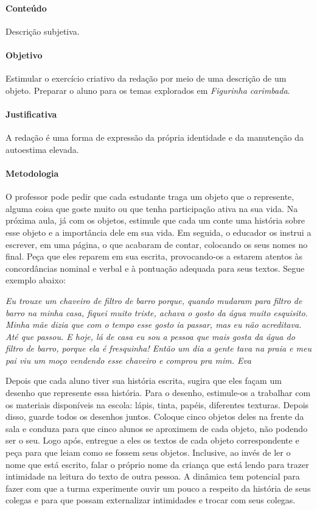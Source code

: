 \documentclass[11pt]{extarticle}
\begin{document}
\paragraph{Conteúdo} Descrição subjetiva. 

\paragraph{Objetivo} Estimular o exercício criativo da redação por meio de uma descrição de um objeto. Preparar o aluno para os temas explorados em \textit{Figurinha carimbada}. 

\paragraph{Justificativa} A redação é uma forma de expressão da própria identidade e da manutenção da autoestima elevada.  

\paragraph{Metodologia} O professor pode pedir que cada estudante traga um objeto que o represente, alguma coisa que goste muito ou que tenha participação ativa na sua vida. Na próxima aula, já com os objetos, estimule que cada um conte uma história sobre esse objeto e a importância dele em sua vida. Em seguida, o educador os instrui a escrever, em uma página, o que acabaram de contar, colocando os seus nomes no final. Peça que eles reparem em sua escrita, provocando-os a estarem atentos às concordâncias nominal e verbal e à pontuação adequada para seus textos. Segue exemplo abaixo:

\textit{Eu trouxe um chaveiro de filtro de barro porque, quando mudaram para filtro de barro na minha casa, fiquei muito triste, achava o gosto da água muito esquisito. Minha mãe dizia que com o tempo esse gosto ia passar, mas eu não acreditava. Até que passou. E hoje, lá de casa eu sou a pessoa que mais gosta da água do filtro de barro, porque ela é fresquinha! Então um dia a gente tava na praia e meu pai viu um moço vendendo esse chaveiro e comprou pra mim.
Eva}

Depois que cada aluno tiver sua história escrita, sugira que eles façam um desenho que represente essa história. Para o desenho, estimule-os a trabalhar com os materiais disponíveis na escola: lápis, tinta, papéis, diferentes texturas. Depois disso, guarde todos os desenhos juntos. Coloque cinco objetos deles na frente da sala e conduza para que cinco alunos se aproximem de cada objeto, não podendo ser o seu. Logo após, entregue a eles os textos de cada objeto correspondente e peça para que leiam como se fossem seus objetos. Inclusive, ao invés de ler o nome que está escrito, falar o próprio nome da criança que está lendo para trazer intimidade na leitura do texto de outra pessoa. A dinâmica tem potencial para fazer com que a turma experimente ouvir um pouco a respeito da história de seus colegas e para que possam externalizar intimidades e trocar com seus colegas. 
\end{document}
